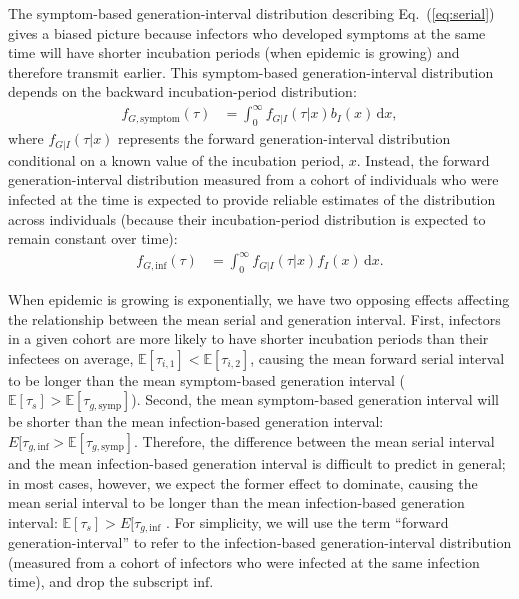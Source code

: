 \documentclass[12pt]{article}
\newcommand{\eref}[1]{Eq.~(\ref{eq:#1})}
\newcommand{\dd}[1]{\ensuremath{\, \mathrm{d}#1}}
\newcommand{\dx}{\dd{x}}
\begin{document}
The symptom-based generation-interval distribution describing \eref{serial} gives a biased picture because infectors who developed symptoms at the same time will have shorter incubation periods (when epidemic is growing) and therefore transmit earlier.
This symptom-based generation-interval distribution depends on the backward incubation-period distribution:
\begin{align}
f_{G, \mathrm{symptom}}(\tau) &= \int_0^\infty f_{G|I}(\tau|x) b_I(x) \dx,
\end{align}
where $f_{G|I}(\tau|x)$ represents the forward generation-interval distribution conditional on a known value of the incubation period, $x$.
Instead, the forward generation-interval distribution measured from a cohort of individuals who were infected at the time is expected to provide reliable estimates of the distribution across individuals (because their incubation-period distribution is expected to remain constant over time):
\begin{align}
f_{G, \mathrm{inf}}(\tau) &= \int_0^\infty f_{G|I}(\tau|x) f_I(x) \dx.
\end{align}

When epidemic is growing is exponentially, we have two opposing effects affecting the relationship between the mean serial and generation interval.
First, infectors in a given cohort are more likely to have shorter incubation periods than their infectees on average, $\mathbb E[\tau_{i, 1}] < \mathbb E[\tau_{i, 2}]$, causing the mean forward serial interval to be longer than the mean symptom-based generation interval ($\mathbb E[\tau_s] > \mathbb E[\tau_{g, \mathrm{symp}}]$).
Second, the mean symptom-based generation interval will be shorter than the mean infection-based generation interval: $E[\tau_{g, \mathrm{inf}} > \mathbb E[\tau_{g, \mathrm{symp}}]$.
Therefore, the difference between the mean serial interval and the mean infection-based generation interval is difficult to predict in general; in most cases, however, we expect the former effect to dominate, causing the mean serial interval to be longer than the mean infection-based generation interval: $\mathbb E[\tau_s] > E[\tau_{g, \mathrm{inf}}$ \citep{park2021forward}.
For simplicity, we will use the term ``forward generation-interval'' to refer to the infection-based generation-interval distribution (measured from a cohort of infectors who were infected at the same infection time), and drop the subscript $\mathrm{inf}$.
\end{document}
